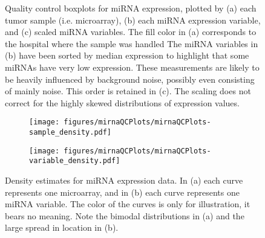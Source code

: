 \begin{figure}
	\centering
	\begin{subfigure}{1\textwidth}
		\centering
	\end{subfigure}
	\begin{subfigure}{1\textwidth}
		\centering
	\end{subfigure}
	\begin{subfigure}{1\textwidth}
		\centering
	\end{subfigure}

	\caption{Quality control boxplots for miRNA expression, plotted by
	(a) each tumor sample (i.e. microarray),
	(b) each miRNA expression variable, 
	and (c) scaled miRNA variables.
	The fill color in (a) corresponds to the hospital where the sample was handled
	The miRNA variables in (b) have been sorted by median expression to highlight that
	some miRNAs have very low expression. These measurements are likely to
	be heavily influenced by background noise, possibly even consisting of
	mainly noise. This order is retained in (c). The scaling does not
	correct for the highly skewed distributions of expression values.}
	\label{fig:qc-mirna-boxplot}
\end{figure}


\begin{figure}[!h]
	\centering
	\begin{subfigure}{.45\textwidth}
		\centering
		\texttt{[image: figures/mirnaQCPlots/mirnaQCPlots-sample\_density.pdf]}
	\end{subfigure}%
	\begin{subfigure}{.45\textwidth}
		\centering
		\texttt{[image: figures/mirnaQCPlots/mirnaQCPlots-variable\_density.pdf]}
	\end{subfigure}

	\caption{Density estimates for miRNA expression data. In (a) each curve represents one microarray,
	and in (b) each curve represents one miRNA variable. The color of the curves is only for illustration,
	it bears no meaning. Note the bimodal distributions in (a) and the large spread in location in (b).}
	\label{fig:qc-mirna-density}
\end{figure}
